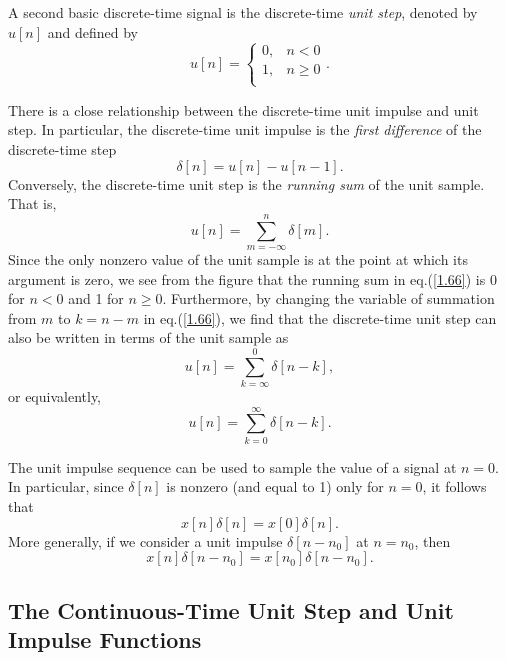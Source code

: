\documentclass[a4paper,twoside]{book}
\begin{document}
A second basic discrete-time signal is the discrete-time \textit{unit step}, denoted by $u[n]$ and defined by
\begin{equation}
    \left.u[n] = \left\{\begin{array}{ll}{0,}&{n<0}\\{1,}&{n\geq0}\\\end{array}\right.\right..
    \label{1.64}
\end{equation}

There is a close relationship between the discrete-time unit impulse and unit step. In particular, the discrete-time unit impulse is the \textit{first difference} of the discrete-time step
\begin{equation}
    \delta[n]=u[n]-u[n-1].
    \label{1.65}
\end{equation}
Conversely, the discrete-time unit step is the \textit{running sum} of the unit sample. That is,
\begin{equation}
    u[n] = \sum_{m=-\infty}^{n}\delta[m].
    \label{1.66}
\end{equation}
Since the only nonzero value of the unit sample is at the point at which its argument is zero, we see from the figure that the running sum in eq.\;(\ref{1.66}) is 0 for $n<0$ and 1 for $n\ge 0$. Furthermore, by changing the variable of summation from $m$ to $k=n-m$ in eq.\;(\ref{1.66}), we find that the discrete-time unit step can also be written in terms of the unit sample as $$u[n]=\sum_{k=\infty}^{0}\delta[n-k],$$ or equivalently,
\begin{equation}
    u[n] = \sum_{k=0}^{\infty}\delta[n-k].
    \label{1.67}
\end{equation}

The unit impulse sequence can be used to sample the value of a signal at $n=0$. In particular, since $\delta[n]$ is nonzero (and equal to 1) only for $n=0$, it follows that
\begin{equation}
    x[n]\delta[n]=x[0]\delta[n].
    \label{1.68}
\end{equation}
More generally, if we consider a unit impulse $\delta[n-n_0]$ at $n=n_0$, then
\begin{equation}
    x[n]\delta[n-n_0]=x[n_0]\delta[n-n_0].
    \label{1.69}
\end{equation}

\subsection{The Continuous-Time Unit Step and Unit Impulse Functions}
\label{section:1.4.2}
\end{document}

